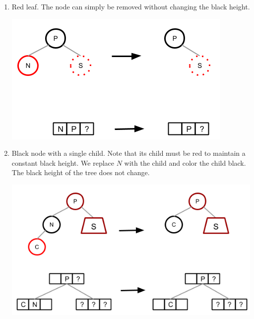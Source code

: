 \documentclass[12pt]{article}
\begin{document}
\begin{enumerate}
  \item Red leaf. The node can simply be removed without changing the black height.
  \begin{center}
    \includegraphics[scale=0.75]{pics/red_black_tree/del_red_leaf}
  \end{center}

  \item Black node with a single child. Note that its child must be red to maintain a constant black height. We replace $N$ with the child and color the child black. The black height of the tree does not change.
  \begin{center}
    \includegraphics[scale=0.7]{pics/red_black_tree/del_black_red_child}
  \end{center}


\end{enumerate}
\end{document}
